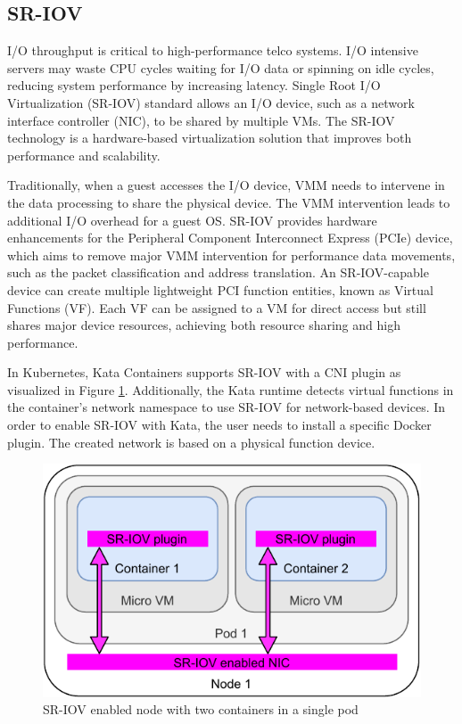 \subsection{SR-IOV}
\label{section:SR-IOV}

I/O throughput is critical to high-performance telco systems. I/O intensive servers may waste CPU cycles waiting for I/O data or spinning on idle cycles, reducing system performance by increasing latency. Single Root I/O Virtualization (SR-IOV) standard allows an I/O device, such as a network interface controller (NIC), to be shared by multiple VMs. The SR-IOV technology is a hardware-based virtualization solution that improves both performance and scalability. \cite{Dong2012}

Traditionally, when a guest accesses the I/O device, VMM needs to intervene in the data processing to share the physical device. The VMM intervention leads to additional I/O overhead for a guest OS. SR-IOV provides hardware enhancements for the Peripheral Component Interconnect Express (PCIe) device, which aims to remove major VMM intervention for performance data movements, such as the packet classification and address translation. An SR-IOV-capable device can create multiple lightweight PCI function entities, known as Virtual Functions (VF). Each VF can be assigned to a VM for direct access but still shares major device resources, achieving both resource sharing and high performance. \cite{Dong2012}

In Kubernetes, Kata Containers supports SR-IOV with a CNI plugin \cite{SR-IOVOpenShift} as visualized in Figure \ref{fig:SR-IOVNode}. Additionally, the Kata runtime detects virtual functions in the container's network namespace to use SR-IOV for network-based devices. In order to enable SR-IOV with Kata, the user needs to install a specific Docker plugin. The created network is based on a physical function device. \cite{SR-IOVKataContainers}

\begin{figure}[ht]
  \begin{center}
    \includegraphics[width=13.5cm]{images/SR-IOVNode.pdf}
    \caption{SR-IOV enabled node with two containers in a single pod}
    \label{fig:SR-IOVNode}
  \end{center}
\end{figure}

